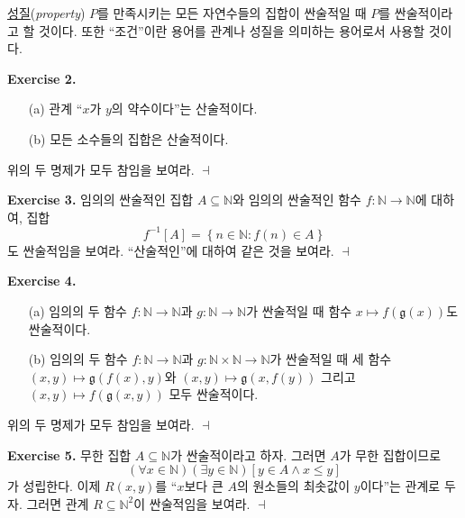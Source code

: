 \documentclass[12pt]{paper}
\newcommand{\gnum}
{ \mathfrak{g} }
\newenvironment{context}[1][]
{ \noindent \textbf{{#1}.} }
{ \hfill $ \dashv $ }
\begin{document}
\underline{성질}(\textit{property}) $P$를 만족시키는 모든 자연수들의 집합이 싼술적일 때 $P$를 싼술적이라고 할 것이다.
또한 ``조건''이란 용어를 관계나 성질을 의미하는 용어로서 사용할 것이다.

\begin{context}[Exercise 2]
\begin{enumerate}
\item[(a)] 관계 ``$x$가 $y$의 약수이다''는 산술적이다.
\item[(b)] 모든 소수들의 집합은 산술적이다.
\end{enumerate}

위의 두 명제가 모두 참임을 보여라.
\end{context}

\begin{context}[Exercise 3]
임의의 싼술적인 집합 $A \subseteq \mathbb{N}$와 임의의 싼술적인 함수 $f : \mathbb{N} \to \mathbb{N}$에 대하여, 집합 $$f^{-1} \left[ A \right] = \left\{ n \in \mathbb{N} : f \left( n \right) \in A \right\}$$도 싼술적임을 보여라.
``산술적인''에 대하여 같은 것을 보여라.
\end{context}

\begin{context}[Exercise 4]
\begin{enumerate}
\item[(a)] 임의의 두 함수 $f : \mathbb{N} \to \mathbb{N}$과 $g : \mathbb{N} \to \mathbb{N}$가 싼술적일 때
함수 $x \mapsto f \left( \gnum \left( x \right) \right)$도 싼술적이다.
\item[(b)] 임의의 두 함수 $f : \mathbb{N} \to \mathbb{N}$과 $g : \mathbb{N} \times \mathbb{N} \to \mathbb{N}$가 싼술적일 때
세 함수 $ \left( x , y \right) \mapsto \gnum \left( f \left( x \right) , y \right) $와 $ \left( x , y \right) \mapsto \gnum \left( x , f \left( y \right) \right) $ 그리고 $ \left( x , y \right) \mapsto f \left( \gnum \left( x , y \right) \right) $ 모두 싼술적이다.
\end{enumerate}

위의 두 명제가 모두 참임을 보여라.
\end{context}

\begin{context}[Exercise 5]
무한 집합 $A \subseteq \mathbb{N}$가 싼술적이라고 하자.
그러면 $A$가 무한 집합이므로 $$\left( \forall x \in \mathbb{N} \right) \left( \exists y \in \mathbb{N} \right) \left[ y \in A \land x \leq y \right]$$가 성립한다.
이제 $R \left( x , y \right)$를 ``$x$보다 큰 $A$의 원소들의 최솟값이 $y$이다''는 관계로 두자.
그러면 관계 $R \subseteq \mathbb{N}^{2}$이 싼술적임을 보여라.
\end{context}
\end{document}

